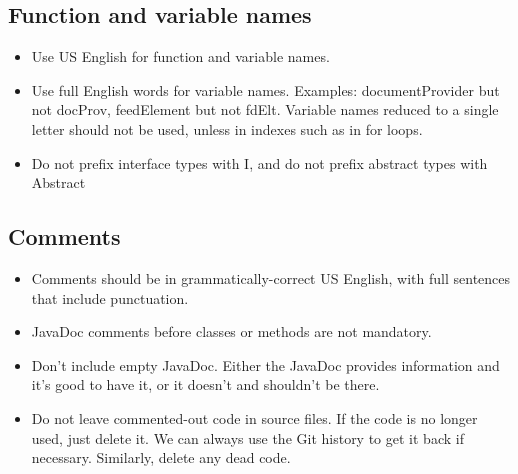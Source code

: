 \documentclass[11pt]{book}
\begin{document}
\subsection{Function and variable names}
\begin{itemize}
    \item Use US English for function and variable names.
    \item Use full English words for variable names. Examples: documentProvider but not docProv, feedElement but not fdElt. Variable names reduced to a single letter should not be used, unless in indexes such as in for loops.
    \item Do not prefix interface types with I, and do not prefix abstract types with Abstract
\end{itemize}

\subsection{Comments}
\begin{itemize}
    \item Comments should be in grammatically-correct US English, with full sentences that include punctuation.
    \item JavaDoc comments before classes or methods are not mandatory.
    \item Don't include empty JavaDoc. Either the JavaDoc provides information and it's good to have it, or it doesn't and shouldn't be there.
    \item Do not leave commented-out code in source files. If the code is no longer used, just delete it. We can always use the Git history to get it back if necessary. Similarly, delete any dead code.
\end{itemize}
\end{document}
